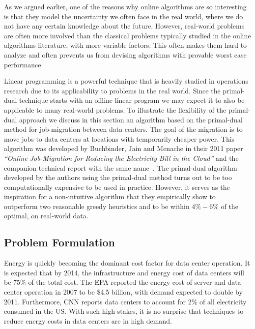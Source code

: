 As we argued earlier, one of the reasons why online algorithms are so interesting is that they model the uncertainty we often face in the real world, where we do not have any certain knowledge about the future.
However, real-world problems are often more involved than the classical problems typically studied in the online algorithms literature, with more variable factors.
This often makes them hard to analyze and often prevents us from devising algorithms with provable worst case performance.

Linear programming is a powerful technique that is heavily studied in operations research due to its applicability to problems in the real world.
Since the primal-dual technique starts with an offline linear program we may expect it to also be applicable to many real-world problems.
To illustrate the flexibility of the primal-dual approach we discuss in this section an algorithm based on the primal-dual method for job-migration between data centers.
The goal of the migration is to move jobs to data centers at locations with temporarily cheaper power.
This algorithm was developed by Buchbinder, Jain and Menache in their 2011 paper \emph{``Online Job-Migration for Reducing the Electricity Bill in the Cloud''} and the companion technical report with the same name~\cite{buchbinder11:job-migration,buchbinder11:job-migration-techreport}.
The primal-dual algorithm developed by the authors using the primal-dual method turns out to be too computationally expensive to be used in practice.
However, it serves as the inspiration for a non-intuitive algorithm that they empirically show to outperform two reasonable greedy heuristics and to be within $4\%-6\%$ of the optimal, on real-world data.

\subsection{Problem Formulation}

Energy is quickly becoming the dominant cost factor for data center operation.
It is expected that by 2014, the infrastructure and energy cost of data centers will be 75\% of the total cost.
The EPA reported the energy cost of server and data center operation in 2007 to be \$4.5 billion, with demand expected to double by 2011.
Furthermore, CNN reports data centers to account for 2\% of all electricity consumed in the US.
With such high stakes, it is no surprise that techniques to reduce energy costs in data centers are in high demand.

